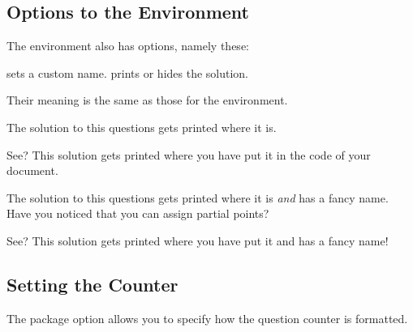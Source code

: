 \documentclass[DIV10,toc=index,toc=bib,numbers=noendperiod]{cnpkgdoc}
\begin{document}
\subsection{Options to the  Environment}
The  environment also has options, namely these:
\begin{beschreibung}
  \Default{}
    sets a custom name.
    prints or hides the solution.
\end{beschreibung}
Their meaning is the same as those for the  environment.
\begin{beispiel}
 \begin{question}{5}
  The solution to this questions gets printed where it is.
 \end{question}
 \begin{solution}[print]
  See? This solution gets printed where you have put it in the code of
  your document.
 \end{solution}
 \begin{question}{2.5}
  The solution to this questions gets printed where it is \emph{and}
  has a fancy name. Have you noticed that you can assign partial
  points?
 \end{question}
 \begin{solution}[print,name=Fancy name]
  See? This solution gets printed where you have put it and has a fancy
  name!
 \end{solution}
\end{beispiel}

\subsection{Setting the Counter}\label{ssec:counter}
The package option  allows you to specify how the question
counter is formatted.
\end{document}
